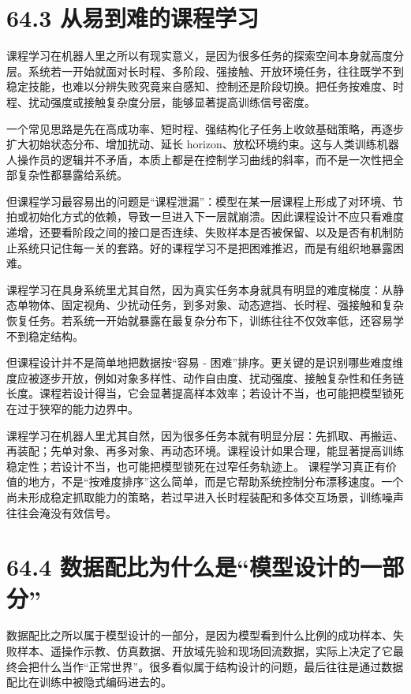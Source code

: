 \section*{64.3 从易到难的课程学习}


课程学习在机器人里之所以有现实意义，是因为很多任务的探索空间本身就高度分层。系统若一开始就面对长时程、多阶段、强接触、开放环境任务，往往既学不到稳定技能，也难以分辨失败究竟来自感知、控制还是阶段切换。把任务按难度、时程、扰动强度或接触复杂度分层，能够显著提高训练信号密度。

一个常见思路是先在高成功率、短时程、强结构化子任务上收敛基础策略，再逐步扩大初始状态分布、增加扰动、延长 horizon、放松环境约束。这与人类训练机器人操作员的逻辑并不矛盾，本质上都是在控制学习曲线的斜率，而不是一次性把全部复杂性都暴露给系统。

但课程学习最容易出的问题是“课程泄漏”：模型在某一层课程上形成了对环境、节拍或初始化方式的依赖，导致一旦进入下一层就崩溃。因此课程设计不应只看难度递增，还要看阶段之间的接口是否连续、失败样本是否被保留、以及是否有机制防止系统只记住每一关的套路。好的课程学习不是把困难推迟，而是有组织地暴露困难。

课程学习在具身系统里尤其自然，因为真实任务本身就具有明显的难度梯度：从静态单物体、固定视角、少扰动任务，到多对象、动态遮挡、长时程、强接触和复杂恢复任务。若系统一开始就暴露在最复杂分布下，训练往往不仅效率低，还容易学不到稳定结构。

但课程设计并不是简单地把数据按“容易 - 困难”排序。更关键的是识别哪些难度维度应被逐步开放，例如对象多样性、动作自由度、扰动强度、接触复杂性和任务链长度。课程若设计得当，它会显著提高样本效率；若设计不当，也可能把模型锁死在过于狭窄的能力边界中。

课程学习在机器人里尤其自然，因为很多任务本就有明显分层：先抓取、再搬运、再装配；先单对象、再多对象、再动态环境。课程设计如果合理，能显著提高训练稳定性；若设计不当，也可能把模型锁死在过窄任务轨迹上。 课程学习真正有价值的地方，不是“按难度排序”这么简单，而是它帮助系统控制分布漂移速度。一个尚未形成稳定抓取能力的策略，若过早进入长时程装配和多体交互场景，训练噪声往往会淹没有效信号。

\section*{64.4 数据配比为什么是“模型设计的一部分”}


数据配比之所以属于模型设计的一部分，是因为模型看到什么比例的成功样本、失败样本、遥操作示教、仿真数据、开放域先验和现场回流数据，实际上决定了它最终会把什么当作“正常世界”。很多看似属于结构设计的问题，最后往往是通过数据配比在训练中被隐式编码进去的。


